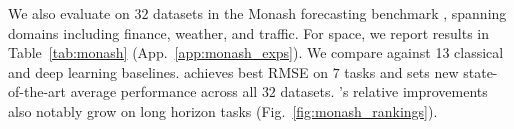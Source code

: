  We also evaluate on $32$ datasets in the Monash forecasting benchmark
\citep{godahewa2021monash}, spanning domains including finance, weather, and traffic. For space, we report results in Table~\ref{tab:monash} (App.~\ref{app:monash_exps}). We compare against 13 classical and deep learning baselines.  
\ourmethod{} achieves best RMSE on $7$ tasks and sets new state-of-the-art average performance across all $32$ datasets.
\ourmethod{}'s relative improvements also notably grow on long horizon tasks (Fig.~\ref{fig:monash_rankings}).


